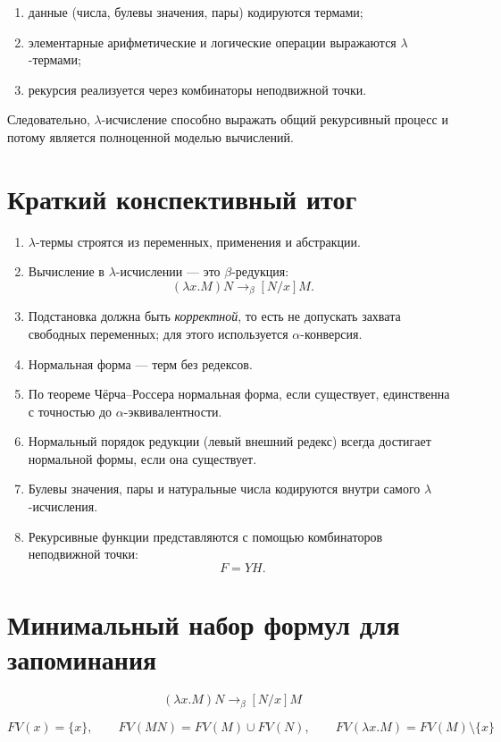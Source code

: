 \documentclass[12pt,a4paper]{article}
\theoremstyle{remark}
\begin{document}
\begin{enumerate}
    \item данные (числа, булевы значения, пары) кодируются термами;
    \item элементарные арифметические и логические операции выражаются $\lambda$-термами;
    \item рекурсия реализуется через комбинаторы неподвижной точки.
\end{enumerate}

Следовательно, $\lambda$-исчисление способно выражать общий рекурсивный процесс и потому является полноценной моделью вычислений.

\section*{Краткий конспективный итог}

\begin{enumerate}
    \item $\lambda$-термы строятся из переменных, применения и абстракции.
    \item Вычисление в $\lambda$-исчислении --- это $\beta$-редукция:
    \[
    (\lambda x.M)N \to_\beta [N/x]M.
    \]
    \item Подстановка должна быть \emph{корректной}, то есть не допускать захвата свободных переменных; для этого используется $\alpha$-конверсия.
    \item Нормальная форма --- терм без редексов.
    \item По теореме Чёрча--Россера нормальная форма, если существует, единственна с точностью до $\alpha$-эквивалентности.
    \item Нормальный порядок редукции (левый внешний редекс) всегда достигает нормальной формы, если она существует.
    \item Булевы значения, пары и натуральные числа кодируются внутри самого $\lambda$-исчисления.
    \item Рекурсивные функции представляются с помощью комбинаторов неподвижной точки:
    \[
    F=YH.
    \]
\end{enumerate}

\section*{Минимальный набор формул для запоминания}

\[
(\lambda x.M)N \to_\beta [N/x]M
\]

\[
FV(x)=\{x\},\qquad
FV(MN)=FV(M)\cup FV(N),\qquad
FV(\lambda x.M)=FV(M)\setminus\{x\}
\]
\end{document}
